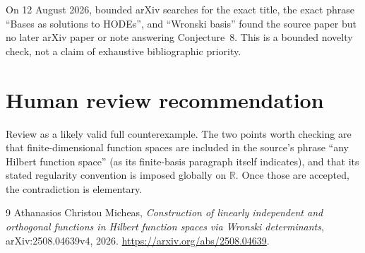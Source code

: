 \documentclass[11pt]{article}
\newcommand{\R}{\mathbb R}
\begin{document}
On 12 August 2026, bounded arXiv searches for the exact title, the exact
phrase ``Bases as solutions to HODEs'', and ``Wronski basis'' found the source
paper but no later arXiv paper or note answering Conjecture~8.  This is a
bounded novelty check, not a claim of exhaustive bibliographic priority.

\section{Human review recommendation}

Review as a likely valid full counterexample.  The two points worth checking
are that finite-dimensional function spaces are included in the source's
phrase ``any Hilbert function space'' (as its finite-basis paragraph itself
indicates), and that its stated regularity convention is imposed globally on
$\R$.  Once those are accepted, the contradiction is elementary.

\begin{thebibliography}{9}
Athanasios Christou Micheas,
\emph{Construction of linearly independent and orthogonal functions in
Hilbert function spaces via Wronski determinants},
arXiv:2508.04639v4, 2026.
\url{https://arxiv.org/abs/2508.04639}.
\end{thebibliography}
\end{document}
